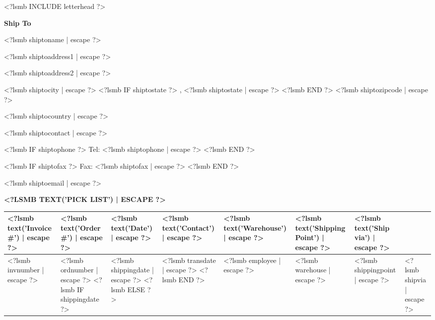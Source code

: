\documentclass{scrartcl}
\begin{document}
\pagestyle{myheadings}
\thispagestyle{empty}

\fontsize{10pt}{12pt}\selectfont

<?lsmb INCLUDE letterhead ?>


%
%
%
%

\vspace*{0.5cm}

\parbox[t]{.5\textwidth}{
  \textbf{Ship To}
} \hfill

\vspace{0.3cm}

\parbox[t]{.5\textwidth}{

<?lsmb shiptoname | escape ?>

<?lsmb shiptoaddress1 | escape ?>

<?lsmb shiptoaddress2 | escape ?>

<?lsmb shiptocity | escape ?>
<?lsmb IF shiptostate ?>
\hspace{-0.1cm}, <?lsmb shiptostate | escape ?>
<?lsmb END ?>
<?lsmb shiptozipcode | escape ?>

<?lsmb shiptocountry | escape ?>
}
\parbox[t]{.5\textwidth}{
  <?lsmb shiptocontact | escape ?>

  <?lsmb IF shiptophone ?>
  Tel: <?lsmb shiptophone | escape ?>
  <?lsmb END ?>

  <?lsmb IF shiptofax ?>
  Fax: <?lsmb shiptofax | escape ?>
  <?lsmb END ?>

  <?lsmb shiptoemail | escape ?>
}
\hfill

\vspace{1cm}

\textbf{\MakeUppercase{<?lsmb text('Pick List') | escape ?>}}
\hfill

\vspace{1cm}

\begin{tabularx}{\textwidth}{*{7}{|X}|} \hline
  \textbf{<?lsmb text('Invoice #') | escape ?>} & \textbf{<?lsmb text('Order #') | escape ?>}
   & \textbf{<?lsmb text('Date') | escape ?>} & \textbf{<?lsmb text('Contact') | escape ?>}
  & \textbf{<?lsmb text('Warehouse') | escape ?>}
  & \textbf{<?lsmb text('Shipping Point') | escape ?>}
  & \textbf{<?lsmb text('Ship via') | escape ?>} \\ [0.5em]
  \hline
  <?lsmb invnumber | escape ?> & <?lsmb ordnumber | escape ?>
  <?lsmb IF shippingdate ?>
  & <?lsmb shippingdate | escape ?>
  <?lsmb ELSE ?>
  & <?lsmb transdate | escape ?>
  <?lsmb END ?>
  & <?lsmb employee | escape ?> & <?lsmb warehouse | escape ?> & <?lsmb shippingpoint | escape ?> & <?lsmb shipvia | escape ?> \\
  \hline
\end{tabularx}
\end{document}
